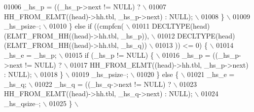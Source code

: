 \begin{DoxyCode}
{{{{{{{{{01006 \textcolor{preprocessor}{              \_hs\_p = ((\_hs\_p->next != NULL) ?                                   \(\backslash\)}
01007 \textcolor{preprocessor}{                HH\_FROM\_ELMT((head)->hh.tbl, \_hs\_p->next) : NULL);               \(\backslash\)}
01008 \textcolor{preprocessor}{            \}                                                                    \(\backslash\)}
01009 \textcolor{preprocessor}{            \_hs\_psize--;                                                         \(\backslash\)}
01010 \textcolor{preprocessor}{          \} else if ((cmpfcn(                                                    \(\backslash\)}
01011 \textcolor{preprocessor}{                DECLTYPE(head)(ELMT\_FROM\_HH((head)->hh.tbl, \_hs\_p)),             \(\backslash\)}
01012 \textcolor{preprocessor}{                DECLTYPE(head)(ELMT\_FROM\_HH((head)->hh.tbl, \_hs\_q))              \(\backslash\)}
01013 \textcolor{preprocessor}{                )) <= 0) \{                                                       \(\backslash\)}
01014 \textcolor{preprocessor}{            \_hs\_e = \_hs\_p;                                                       \(\backslash\)}
01015 \textcolor{preprocessor}{            if (\_hs\_p != NULL) \{                                                 \(\backslash\)}
01016 \textcolor{preprocessor}{              \_hs\_p = ((\_hs\_p->next != NULL) ?                                   \(\backslash\)}
01017 \textcolor{preprocessor}{                HH\_FROM\_ELMT((head)->hh.tbl, \_hs\_p->next) : NULL);               \(\backslash\)}
01018 \textcolor{preprocessor}{            \}                                                                    \(\backslash\)}
01019 \textcolor{preprocessor}{            \_hs\_psize--;                                                         \(\backslash\)}
01020 \textcolor{preprocessor}{          \} else \{                                                               \(\backslash\)}
01021 \textcolor{preprocessor}{            \_hs\_e = \_hs\_q;                                                       \(\backslash\)}
01022 \textcolor{preprocessor}{            \_hs\_q = ((\_hs\_q->next != NULL) ?                                     \(\backslash\)}
01023 \textcolor{preprocessor}{              HH\_FROM\_ELMT((head)->hh.tbl, \_hs\_q->next) : NULL);                 \(\backslash\)}
01024 \textcolor{preprocessor}{            \_hs\_qsize--;                                                         \(\backslash\)}
01025 \textcolor{preprocessor}{          \}                                                                      \(\backslash\)}
}}}}}}}}}
\end{DoxyCode}
